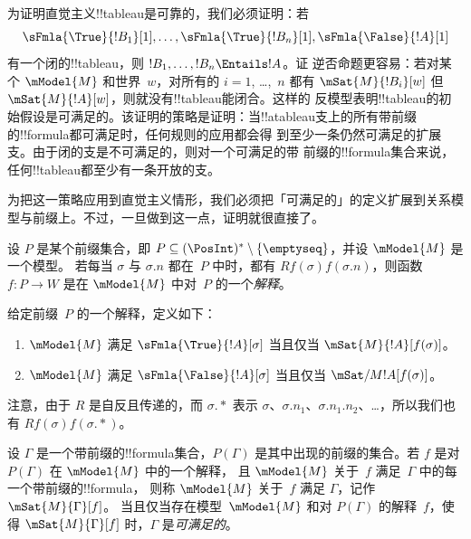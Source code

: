 \documentclass[../../../include/open-logic-section]{subfiles}
\begin{document}


\begin{explain}
  为证明直觉主义!!{tableau}是可靠的，我们必须证明：若
  \[
  \sFmla{\True}{!B_1}[1], \dots, \sFmla{\True}{!B_n}[1], \sFmla{\False}{!A}[1]
  \]
  有一个闭的!!{tableau}，则 $!B_1, \dots, !B_n \Entails !A$。证
  逆否命题更容易：若对某个 $\mModel{M}$ 和世界~$w$，对所有的 $i=1$, \dots,~$n$ 都有
  $\mSat{M}{!B_i}[w]$ 但 $\mSat{M}{!A}[w]$，则就没有!!{tableau}能闭合。这样的
  反模型表明!!{tableau}的初始假设是可满足的。该证明的策略是证明：当!!a{tableau}支上的所有带前缀的!!{formula}都可满足时，任何规则的应用都会得
  到至少一条仍然可满足的扩展支。由于闭的支是不可满足的，则对一个可满足的带
  前缀的!!{formula}集合来说，任何!!{tableau}都至少有一条开放的支。

  为把这一策略应用到直觉主义情形，我们必须把「可满足的」的定义扩展到关系模型与前缀上。不过，一旦做到这一点，证明就很直接了。
\end{explain}

\begin{defn}
  设 $P$ 是某个前缀集合，即 $P \subseteq (\PosInt)^*
  \setminus \{\emptyseq\}$，并设 $\mModel{M}$ 是一个模型。 若每当 $\sigma$ 与 $\sigma.n$
  都在~$P$ 中时，都有 $Rf(\sigma)f(\sigma.n)$，则函数~$f\colon P \to W$ 是在
  $\mModel{M}$ 中对~$P$ 的一个\emph{解释}。

  给定前缀~$P$ 的一个解释，定义如下：
  \begin{enumerate}
  \item $\mModel{M}$ 满足 $\sFmla{\True}{!A}[\sigma]$ 当且仅当 $\mSat{M}{!A}[f(\sigma)]$。
  \item $\mModel{M}$ 满足 $\sFmla{\False}{!A}[\sigma]$ 当且仅当 $\mSat/{M}{!A}[f(\sigma)]$。
  \end{enumerate}
\end{defn}

注意，由于 $R$ 是自反且传递的，而 $\sigma.{*}$
表示 $\sigma$、$\sigma.n_1$、$\sigma.n_1.n_2$、\dots，所以我们也有
$Rf(\sigma)f(\sigma.{*})$。

\begin{defn}
  设 $\Gamma$ 是一个带前缀的!!{formula}集合，$P(\Gamma)$
  是其中出现的前缀的集合。若 $f$ 是对 $P(\Gamma)$ 在 $\mModel{M}$ 中的一个解释，
  且 $\mModel{M}$ 关于~$f$ 满足~$\Gamma$ 中的每一个带前缀的!!{formula}，
  则称 $\mModel{M}$ 关于~$f$ 满足 $\Gamma$，记作 $\mSat{M}{\Gamma}[f]$。
  当且仅当存在模型~$\mModel{M}$ 和对 $P(\Gamma)$ 的解释~$f$，使得
  $\mSat{M}{\Gamma}[f]$ 时，$\Gamma$ 是\emph{可满足的}。
\end{defn}
\end{document}
